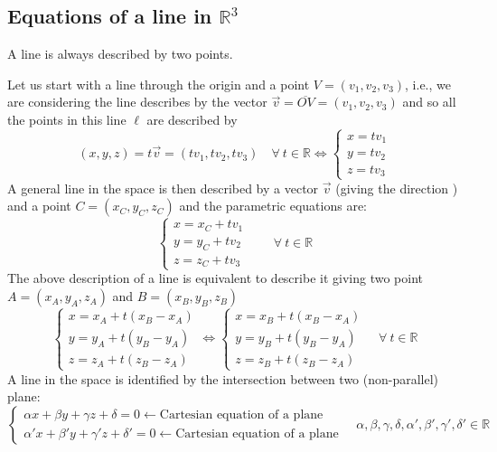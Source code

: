 \subsection{Equations of a line in $\mathbb{R}^3$}
A line is always described by two points.

Let us start with a line through  the origin and a point $V = (v_1, v_2, v_3)$, i.e., we are considering the line describes by the vector $\vec v = \overline{OV} = (v_1,v_2,v_3)$ and so all the points in this line $\ell$ are described by
$$(x,y,z) = t \vec v = (tv_1, tv_2, tv_3) \quad \forall \ t \in \mathbb{R} \iff \begin{cases}
    x = tv_1 \\
    y = tv_2 \\
    z = tv_3
\end{cases}$$
A general line in the space is then described by a vector $\vec v$ (giving the direction ) and a point $C=(x_C, y_C, z_C)$ and the parametric equations are:
$$\begin{cases}
    x = x_C + tv_1\\
    y = y_C + tv_2 \\
    z = z_C + tv_3
\end{cases} \qquad \forall \ t \in \mathbb{R}$$
The above description of a line is equivalent to describe it giving two point $A = (x_A, y_A, z_A)$ and $B=(x_B,y_B,z_B)$
$$\begin{cases}
    x = x_A + t(x_B-x_A)\\
    y = y_A + t(y_B-y_A) \\
    z = z_A + t(z_B-z_A)
\end{cases} \iff \begin{cases}
    x = x_B + t(x_B-x_A)\\
    y = y_B + t(y_B-y_A) \\
    z = z_B + t(z_B-z_A)
\end{cases} \quad \forall \ t \in \mathbb{R}$$
A line in the space is identified by the intersection between two (non-parallel) plane: 
$$\begin{cases}\alpha x + \beta y+ \gamma z + \delta= 0 \leftarrow \text{Cartesian equation of a plane}\\
\alpha'x+\beta'y+\gamma'z+ \delta' = 0 \leftarrow \text{Cartesian equation of a plane}
\end{cases} \quad \alpha, \beta,\gamma,\delta, \alpha', \beta', \gamma', \delta' \in \mathbb{R}
$$
